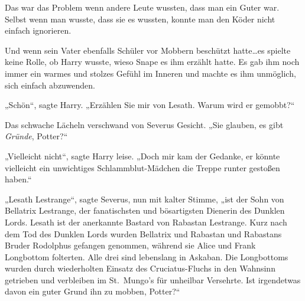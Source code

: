 Das war das Problem wenn andere Leute wussten, dass man ein Guter war. Selbst wenn man wusste, dass sie es wussten, konnte man den Köder nicht einfach ignorieren.

Und wenn sein Vater ebenfalls Schüler vor Mobbern beschützt hatte…es spielte keine Rolle, ob Harry wusste, wieso Snape es ihm erzählt hatte. Es gab ihm noch immer ein warmes und stolzes Gefühl im Inneren und machte es ihm unmöglich, sich einfach abzuwenden.

„Schön“, sagte Harry. „Erzählen Sie mir von Lesath. Warum wird er gemobbt?“

Das schwache Lächeln verschwand von Severus Gesicht. „Sie glauben, es gibt \emph{Gründe}, Potter?“

„Vielleicht nicht“, sagte Harry leise. „Doch mir kam der Gedanke, er könnte vielleicht ein unwichtiges Schlammblut-Mädchen die Treppe runter gestoßen haben.“

„Lesath Lestrange“, sagte Severus, nun mit kalter Stimme, „ist der Sohn von Bellatrix Lestrange, der fanatischsten und bösartigsten Dienerin des Dunklen Lords. Lesath ist der anerkannte Bastard von Rabastan Lestrange. Kurz nach dem Tod des Dunklen Lords wurden Bellatrix und Rabastan und Rabastans Bruder Rodolphus gefangen genommen, während sie Alice und Frank Longbottom folterten. Alle drei sind lebenslang in Askaban. Die Longbottoms wurden durch wiederholten Einsatz des Cruciatus-Fluchs in den Wahnsinn getrieben und verbleiben im St.~Mungo’s für unheilbar Versehrte. Ist irgendetwas davon ein guter Grund ihn zu mobben, Potter?“

